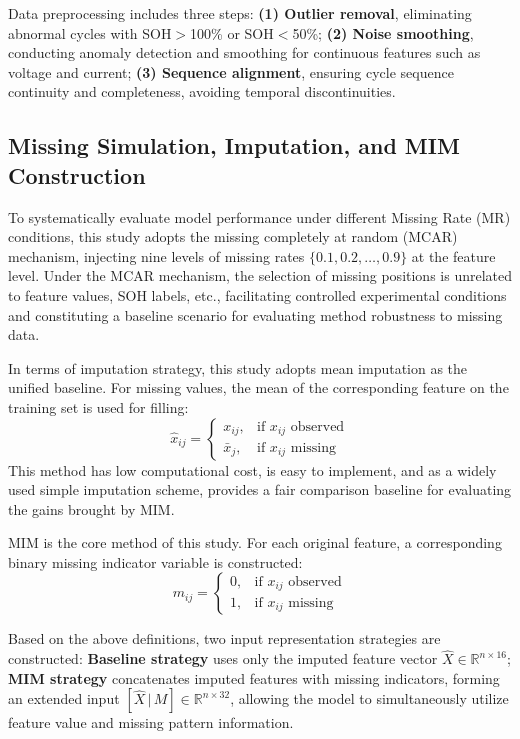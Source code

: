 \documentclass[5p,times]{elsarticle}
\begin{document}
Data preprocessing includes three steps: \textbf{(1) Outlier removal}, eliminating abnormal cycles with SOH$>$100\% or SOH$<$50\%; \textbf{(2) Noise smoothing}, conducting anomaly detection and smoothing for continuous features such as voltage and current; \textbf{(3) Sequence alignment}, ensuring cycle sequence continuity and completeness, avoiding temporal discontinuities.

\subsection{Missing Simulation, Imputation, and MIM Construction}

To systematically evaluate model performance under different Missing Rate (MR) conditions, this study adopts the missing completely at random (MCAR) mechanism, injecting nine levels of missing rates $\{0.1, 0.2, \ldots, 0.9\}$ at the feature level. Under the MCAR mechanism, the selection of missing positions is unrelated to feature values, SOH labels, etc., facilitating controlled experimental conditions and constituting a baseline scenario for evaluating method robustness to missing data.

In terms of imputation strategy, this study adopts mean imputation as the unified baseline. For missing values, the mean of the corresponding feature on the training set is used for filling:
\begin{equation}
    \hat{x}_{ij} = \begin{cases}
        x_{ij}, & \text{if } x_{ij} \text{ observed} \\
        \bar{x}_j, & \text{if } x_{ij} \text{ missing}
    \end{cases}
\end{equation}
This method has low computational cost, is easy to implement, and as a widely used simple imputation scheme, provides a fair comparison baseline for evaluating the gains brought by MIM.

MIM is the core method of this study. For each original feature, a corresponding binary missing indicator variable is constructed:
\begin{equation}
    m_{ij} = 
    \begin{cases}
        0, & \text{if } x_{ij} \text{ observed} \\
        1, & \text{if } x_{ij} \text{ missing}
    \end{cases}
\end{equation}

Based on the above definitions, two input representation strategies are constructed: \textbf{Baseline strategy} uses only the imputed feature vector $\hat{X} \in \mathbb{R}^{n \times 16}$; \textbf{MIM strategy} concatenates imputed features with missing indicators, forming an extended input $[\hat{X} \,|\, M] \in \mathbb{R}^{n \times 32}$, allowing the model to simultaneously utilize feature value and missing pattern information.
\end{document}
